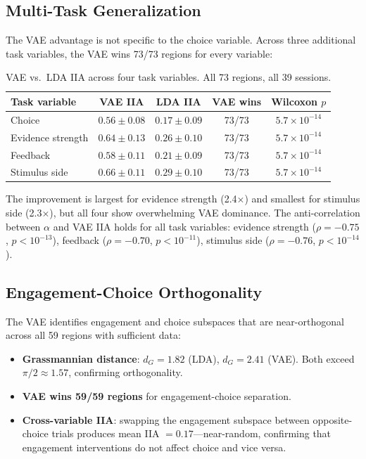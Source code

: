 \documentclass{article}
\begin{document}
\subsection{Multi-Task Generalization}

The VAE advantage is not specific to the choice variable. Across three additional task variables, the VAE wins 73/73 regions for every variable:

\begin{table}[h]
\centering
\small
\caption{VAE vs.\ LDA IIA across four task variables. All 73 regions, all 39 sessions.}
\label{tab:multitask}
\begin{tabular}{lcccc}
\toprule
Task variable & VAE IIA & LDA IIA & VAE wins & Wilcoxon $p$ \\
\midrule
Choice & $0.56 \pm 0.08$ & $0.17 \pm 0.09$ & 73/73 & $5.7 \times 10^{-14}$ \\
Evidence strength & $0.64 \pm 0.13$ & $0.26 \pm 0.10$ & 73/73 & $5.7 \times 10^{-14}$ \\
Feedback & $0.58 \pm 0.11$ & $0.21 \pm 0.09$ & 73/73 & $5.7 \times 10^{-14}$ \\
Stimulus side & $0.66 \pm 0.11$ & $0.29 \pm 0.10$ & 73/73 & $5.7 \times 10^{-14}$ \\
\bottomrule
\end{tabular}
\end{table}

The improvement is largest for evidence strength (2.4$\times$) and smallest for stimulus side (2.3$\times$), but all four show overwhelming VAE dominance. The anti-correlation between $\alpha$ and VAE IIA holds for all task variables: evidence strength ($\rho = -0.75$, $p < 10^{-13}$), feedback ($\rho = -0.70$, $p < 10^{-11}$), stimulus side ($\rho = -0.76$, $p < 10^{-14}$).

\subsection{Engagement-Choice Orthogonality}

The VAE identifies engagement and choice subspaces that are near-orthogonal across all 59 regions with sufficient data:

\begin{itemize}
\item \textbf{Grassmannian distance}: $d_G = 1.82$ (LDA), $d_G = 2.41$ (VAE). Both exceed $\pi/2 \approx 1.57$, confirming orthogonality.
\item \textbf{VAE wins 59/59 regions} for engagement-choice separation.
\item \textbf{Cross-variable IIA}: swapping the engagement subspace between opposite-choice trials produces mean IIA $= 0.17$---near-random, confirming that engagement interventions do not affect choice and vice versa.
\end{itemize}
\end{document}
